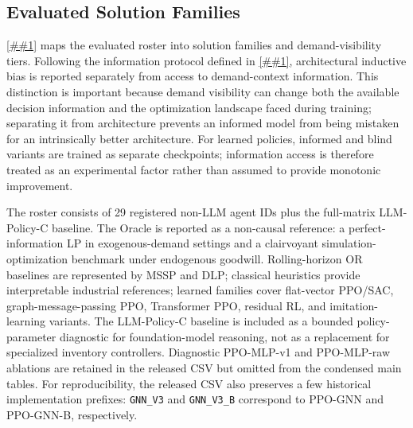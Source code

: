 \documentclass[10pt,a4paper]{article}
\providecommand{\Cref}[1]{\ref{##1}}
\begin{document}
\subsection{Evaluated Solution Families}

\Cref{tab:paradigm_comparison} maps the evaluated roster into solution
families and demand-visibility tiers. Following the information protocol
defined in \Cref{sec:information_protocol}, architectural inductive bias
is reported separately from access to demand-context information. This
distinction is important because demand visibility can change both the
available decision information and the optimization landscape faced during
training; separating it from architecture prevents an informed model from
being mistaken for an intrinsically better architecture. For learned
policies, informed and blind variants are trained as separate checkpoints;
information access is therefore treated as an experimental factor rather
than assumed to provide monotonic improvement.

The roster consists of 29 registered non-LLM agent IDs plus the
full-matrix LLM-Policy-C baseline. The Oracle is reported as a non-causal
reference: a perfect-information LP in exogenous-demand settings and a
clairvoyant simulation-optimization benchmark under endogenous goodwill.
Rolling-horizon OR baselines are represented by MSSP and DLP; classical
heuristics provide interpretable industrial references; learned families
cover flat-vector PPO/SAC, graph-message-passing PPO, Transformer PPO,
residual RL, and imitation-learning variants. The LLM-Policy-C baseline
is included as a bounded policy-parameter diagnostic for foundation-model
reasoning, not as a replacement for specialized inventory controllers.
Diagnostic PPO-MLP-v1 and PPO-MLP-raw ablations are retained in the
released CSV but omitted from the condensed main tables.
For reproducibility, the released CSV also preserves a few historical
implementation prefixes: \texttt{GNN\_V3} and \texttt{GNN\_V3\_B}
correspond to PPO-GNN and PPO-GNN-B, respectively.
\end{document}
